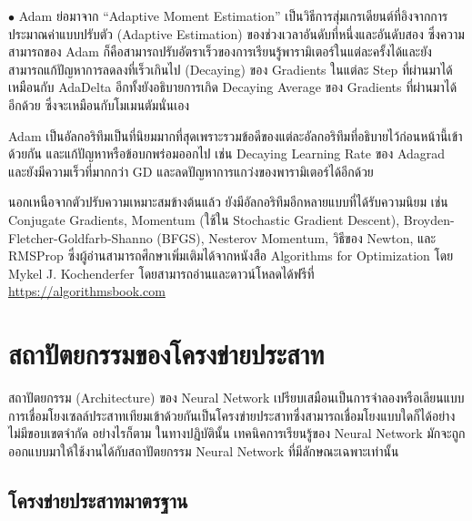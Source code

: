 \noindent $\bullet$ Adam ย่อมาจาก \enquote{Adaptive Moment Estimation} เป็นวิธีการสุ่มเกรเดียนต์ที่อิงจากการประมาณค่าแบบปรับตัว (Adaptive Estimation) ของช่วงเวลาอันดับที่หนึ่งและอันดับสอง ซึ่งความสามารถของ Adam ก็คือสามารถปรับอัตราเร็วของการเรียนรู้พารามิเตอร์ในแต่ละครั้งได้และยังสามารถแก้ปัญหาการลดลงที่เร็วเกินไป (Decaying) ของ Gradients ในแต่ละ Step ที่ผ่านมาได้เหมือนกับ AdaDelta อีกทั้งยังอธิบายการเกิด Decaying Average ของ Gradients ที่ผ่านมาได้อีกด้วย ซึ่งจะเหมือนกับโมเมนตัมนั่นเอง

Adam เป็นอัลกอริทึมเป็นที่นิยมมากที่สุดเพราะรวมข้อดีของแต่ละอัลกอริทึมที่อธิบายไว้ก่อนหน้านี้เข้าด้วยกัน และแก้ปัญหาหรือข้อบกพร่อมออกไป เช่น Decaying Learning Rate ของ Adagrad และยังมีความเร็วที่มากกว่า GD และลดปัญหาการแกว่งของพารามิเตอร์ได้อีกด้วย

นอกเหนือจากตัวปรับความเหมาะสมข้างต้นแล้ว ยังมีอัลกอริทึมอีกหลายแบบที่ได้รับความนิยม เช่น Conjugate Gradients, Momentum (ใช้ใน Stochastic Gradient Descent), Broyden-Fletcher-Goldfarb-Shanno (BFGS), Nesterov Momentum, วิธีของ Newton, และ RMSProp ซึ่งผู้อ่านสามารถศึกษาเพิ่มเติมได้จากหนังสือ Algorithms for Optimization\autocite{kochenderfer2019} โดย Mykel J. Kochenderfer โดยสามารถอ่านและดาวน์โหลดได้ฟรีที่ \url{https://algorithmsbook.com}

\section{สถาปัตยกรรมของโครงข่ายประสาท}
\label{sec:arch_nn}

สถาปัตยกรรม (Architecture) ของ Neural Network เปรียบเสมือนเป็นการจำลองหรือเลียนแบบการเชื่อมโยงเซลล์ประสาทเทียมเข้าด้วยกันเป็นโครงข่ายประสาทซึ่งสามารถเชื่อมโยงแบบใดก็ได้อย่างไม่มีขอบเขตจำกัด อย่างไรก็ตาม ในทางปฏิบัตินั้น เทคนิคการเรียนรู้ของ Neural Network มักจะถูกออกแบบมาให้ใช้งานได้กับสถาปัตยกรรม Neural Network ที่มีลักษณะเฉพาะเท่านั้น

\subsection{โครงข่ายประสาทมาตรฐาน}
\label{ssec:std_nn}

